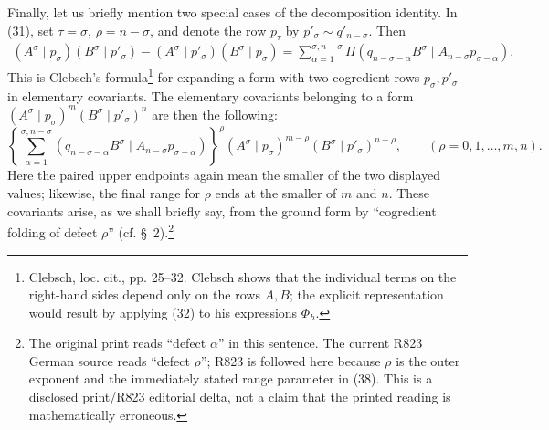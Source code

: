 \documentclass[10pt]{article}
\newcommand{\pair}[2]{(#1\mid #2)}
\begin{document}
Finally, let us briefly mention two special cases of the decomposition
identity. In (31), set $\tau=\sigma$, $\rho=n-\sigma$, and denote the row
$p_\tau$ by $p'_\sigma\sim q'_{n-\sigma}$. Then
\begin{equation}
\begin{aligned}
\pair{A^\sigma}{p_\sigma}\pair{B^\sigma}{p'_\sigma}
-\pair{A^\sigma}{p'_\sigma}\pair{B^\sigma}{p_\sigma}
=\sum_{\alpha=1}^{\sigma,n-\sigma}
\Pi\pair{q_{n-\sigma-\alpha}B^\sigma}
{A_{n-\sigma}p_{\sigma-\alpha}}.
\end{aligned}
\tag{37}
\end{equation}
This is Clebsch's formula\footnote{Clebsch, loc. cit., pp. 25--32. Clebsch
shows that the individual terms on the right-hand sides depend only on the
rows $A,B$; the explicit representation would result by applying (32) to his
expressions $\Phi_h$.} for expanding a form with two cogredient rows
$p_\sigma,p'_\sigma$ in elementary covariants. The elementary covariants
belonging to a form
$\pair{A^\sigma}{p_\sigma}^m\pair{B^\sigma}{p'_\sigma}^n$ are then the
following:
\begin{equation}
 \left\{\sum_{\alpha=1}^{\sigma,n-\sigma}
 \pair{q_{n-\sigma-\alpha}B^\sigma}
 {A_{n-\sigma}p_{\sigma-\alpha}}
 \right\}^{\rho}
 \pair{A^\sigma}{p_\sigma}^{m-\rho}
 \pair{B^\sigma}{p'_\sigma}^{n-\rho},
 \qquad (\rho=0,1,\ldots,m,n).
\tag{38}
\end{equation}
Here the paired upper endpoints again mean the smaller of the two displayed
values; likewise, the final range for $\rho$ ends at the smaller of $m$ and
$n$. These covariants arise, as we shall briefly say, from the ground form by
``cogredient folding of defect $\rho$'' (cf. \S\ 2).\footnote{The original
print reads ``defect $\alpha$'' in this sentence. The current R823 German
source reads ``defect $\rho$''; R823 is followed here because $\rho$ is the
outer exponent and the immediately stated range parameter in (38). This is a
disclosed print/R823 editorial delta, not a claim that the printed reading is
mathematically erroneous.}
\end{document}

